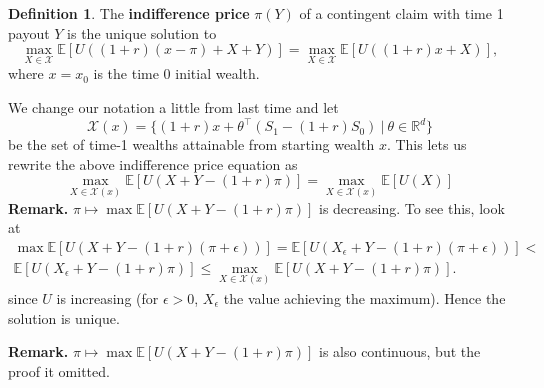 \documentclass{article}
\theoremstyle{definition}
\newtheorem{defn}{Definition}[section]
\begin{document}
\begin{defn}
    The \textbf{indifference price} $\pi(Y)$ of a contingent claim with time 1 payout $Y$ is the unique solution to 
    \[
    \max_{X \in \mathcal{X}} \mathbb{E}[U((1+r)(x-\pi)+X+Y)] = \max_{X \in \mathcal{X}} \mathbb{E}[U((1+r)x + X)],
    \] where $x = x_0$ is the time 0 initial wealth.     
\end{defn}


We change our notation a little from last time and let 
\[
\mathcal{X}(x)=\{(1+r)x + \theta^\top(S_1-(1+r)S_0) ~|~ \theta \in \mathbb{R}^d\}
\]
be the set of time-1 wealths attainable from starting wealth $x$.
This lets us rewrite the above indifference price equation as \[
\max_{X \in \mathcal{X}(x)} \mathbb{E}[U(X+Y-(1+r)\pi)] = \max_{X \in \mathcal{X}(x)}\mathbb{E}[U(X)]
\]
\textbf{Remark.} $\pi \mapsto \max \mathbb{E}[U(X+Y-(1+r)\pi)]$ is decreasing. To see this, look at 
\begin{align*}
    \max \mathbb{E}[U(X+Y-(1+r)(\pi+\epsilon))] = \mathbb{E}[U(X_\epsilon + Y -(1+r)(\pi+\epsilon))] < \\
    \mathbb{E}[U(X_{\epsilon}+Y-(1+r)\pi)] \le \max_{X \in \mathcal{X}(x)} \mathbb{E}[U(X+Y-(1+r)\pi)].
\end{align*}
since $U$ is increasing (for $\epsilon>0$, $X_\epsilon$ the value achieving the maximum). Hence the solution is unique.

\textbf{Remark.} $\pi \mapsto \max \mathbb{E}[U(X+Y-(1+r)\pi)]$ is also continuous, but the proof it omitted.
\vspace{1mm}
\end{document}
